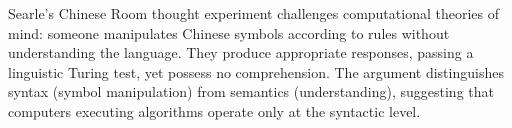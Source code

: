 Searle's Chinese Room thought experiment challenges computational theories of mind: someone manipulates Chinese symbols according to rules without understanding the language. They produce appropriate responses, passing a linguistic Turing test, yet possess no comprehension. The argument distinguishes syntax (symbol manipulation) from semantics (understanding), suggesting that computers executing algorithms operate only at the syntactic level.
